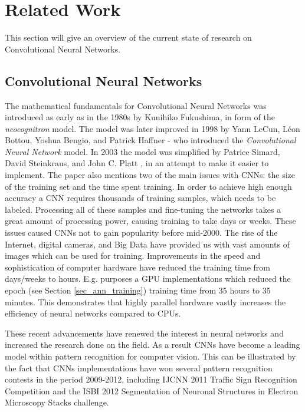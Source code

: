\chapter{Related Work} \label{chap_related_work}

This section will give an overview of the current state of research on Convolutional Neural Networks. 

\section{Convolutional Neural Networks}
The mathematical fundamentals for Convolutional Neural Networks was introduced as early as in the 1980s by Kunihiko Fukushima\cite{Fukushima1980}\cite{Fukushima1982}, in form of the \textit{neocognitron} model. The model was later improved in 1998 by  Yann LeCun, Léon Bottou, Yoshua Bengio, and Patrick Haffner - who introduced the \textit{Convolutional Neural Network} model. In 2003 the model was simplified by Patrice Simard, David Steinkraus, and John C. Platt \cite{Simard2000}, in an attempt to make it easier to implement. The paper also mentions two of the main issues with CNNs: the size of the training set and the time spent training. In order to achieve high enough accuracy a CNN requires thousands of training samples, which needs to be labeled. Processing all of these samples and fine-tuning the networks takes a great amount of processing power, causing training to take days or weeks. These issues caused CNNs not to gain popularity before mid-2000. The rise of the Internet, digital cameras, and Big Data have provided us with vast amounts of images which can be used for training. Improvements in the speed and sophistication of computer hardware have reduced the training time from days/weeks to hours. E.g. \cite{Cires2003} purposes a GPU implementations which reduced the epoch (see Section \ref{sec_ann_training}) training time from 35 hours to 35 minutes. This demonstrates that highly parallel hardware vastly increases the efficiency of neural networks compared to CPUs. 

These recent advancements have renewed the interest in neural networks and increased the research done on the field. As a result CNNs have become a leading model within pattern recognition for computer vision. This can be illustrated by the fact that CNNs implementations have won several pattern recognition contests in the period 2009-2012, including IJCNN 2011 Traffic Sign Recognition Competition\cite{Ciresan2012} and the ISBI 2012 Segmentation of Neuronal Structures in Electron Microscopy Stacks challenge\cite{DanC.Ciresan2012}.



